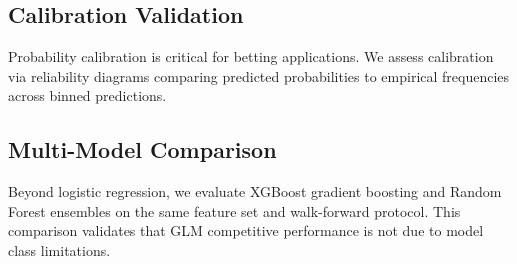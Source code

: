\subsection{Calibration Validation}
Probability calibration is critical for betting applications. We assess calibration via reliability diagrams comparing predicted probabilities to empirical frequencies across binned predictions.


\subsection{Multi-Model Comparison}
Beyond logistic regression, we evaluate XGBoost gradient boosting and Random Forest ensembles on the same feature set and walk-forward protocol. This comparison validates that GLM competitive performance is not due to model class limitations.

